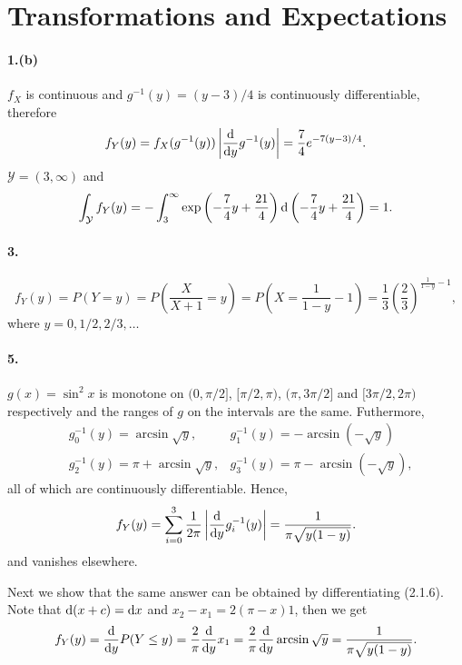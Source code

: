 \section{Transformations and Expectations}

\paragraph{1.(b)}
\begin{solution}
  $f_X$ is continuous and $g^{-1}(y)=(y-3)/4$ is continuously differentiable,
  therefore
  \[
    f_Y(y)=f_X(g^{-1}(y))\left|\frac{\mathrm{d}}{\mathrm{d} y}g^{-1}(y)\right|
    = \frac{7}{4}e^{-7(y-3)/4}.
  \]
  $\mathcal{Y}=(3, \infty)$ and
  \[
    \int_\mathcal{Y} f_Y(y) 
    = -\int_3^\infty \exp\left(-\frac{7}{4}y+\frac{21}{4}\right)
      \mathrm{d}\left(-\frac{7}{4}y+\frac{21}{4}\right)
    = 1.
  \]
\end{solution}

\paragraph{3.}
\begin{solution}
  \[
    f_Y(y)=P(Y=y)=P\left(\frac{X}{X+1}=y\right)
    = P\left(X=\frac{1}{1-y}-1\right) 
    = \frac{1}{3}\left(\frac{2}{3}\right)^{\frac{1}{1-y}-1},
  \]
  where $y= 0, 1/2, 2/3, \dots$
\end{solution}

\paragraph{5.}
\begin{solution}
  $g(x) = \sin^2x$ is monotone on $(0,\pi/2]$, $[\pi/2,\pi)$, $(\pi,3\pi/2]$ and
  $[3\pi/2, 2\pi)$ respectively and the ranges of $g$ on the intervals are the 
  same. Futhermore,
  \[\begin{matrix}
    &g_0^{-1}(y) = \arcsin\sqrt{y},    & g_1^{-1}(y)=-\arcsin(-\sqrt{y}) \\
    &g_2^{-1}(y) = \pi+\arcsin\sqrt{y}, & g_3^{-1}(y)=\pi-\arcsin(-\sqrt{y}),
  \end{matrix}\]
  all of which are continuously differentiable. Hence,
  \[
    f_Y(y) 
    = \sum_{i=0}^3 \frac{1}{2\pi}\left|\frac{\mathrm{d}}{\mathrm{d} y}g^{-1}_i(y)\right|
    = \frac{1}{\pi\sqrt{y(1-y)}}.
  \]
  and vanishes elsewhere.\par
  Next we show that the same answer can be obtained by differentiating (2.1.6).
  Note that $\mathrm{d}(x+c) = \mathrm{d} x$ and $x_2-x_1=2(\pi-x)1$, then we get
  \[
    f_Y(y)=\frac{\mathrm{d}}{\mathrm{d} y}P(Y\le y)
    = \frac{2}{\pi}\frac{\mathrm{d}}{\mathrm{d} y}x_1 
    = \frac{2}{\pi}\frac{\mathrm{d}}{\mathrm{d} y}\arcsin\sqrt{y}
    = \frac{1}{\pi\sqrt{y(1-y)}}.
  \]
\end{solution}

